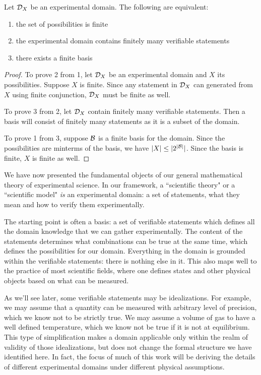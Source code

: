 \documentclass[11pt,letterpaper,fleqn]{memoir} %
\begin{document}
\begin{mathSection}
\begin{prop}
	Let $\mathcal{D}_X$ be an experimental domain. The following are equivalent:
	\begin{enumerate}
		\item the set of possibilities is finite
		\item the experimental domain contains finitely many verifiable statements
		\item there exists a finite basis
	\end{enumerate}
\end{prop}
\begin{proof}
	To prove 2 from 1, let $\mathcal{D}_X$ be an experimental domain and $X$ its possibilities. Suppose $X$ is finite. Since any statement in $\mathcal{D}_X$ can generated from $X$ using finite conjunction, $\mathcal{D}_X$ must be finite as well.
	
	To prove 3 from 2, let $\mathcal{D}_X$ contain finitely many verifiable statements. Then a basis will consist of finitely many statements as it is a subset of the domain.
	
	To prove 1 from 3, suppose $\mathcal{B}$ is a finite basis for the domain. Since the possibilities are minterms of the basis, we have $|X| \leq |2^{|\mathcal{B}|}|$. Since the basis is finite, $X$ is finite as well.
\end{proof}
\end{mathSection}

We have now presented the fundamental objects of our general mathematical theory of experimental science. In our framework, a ``scientific theory" or a ``scientific model" \emph{is} an experimental domain: a set of statements, what they mean and how to verify them experimentally.

The starting point is often a basis: a set of verifiable statements which defines all the domain knowledge that we can gather experimentally. The content of the statements determines what combinations can be true at the same time, which defines the possibilities for our domain. Everything in the domain is grounded within the verifiable statements: there is nothing else in it. This also maps well to the practice of most scientific fields, where one defines states and other physical objects based on what can be measured.

As we'll see later, some verifiable statements may be idealizations. For example, we may assume that a quantity can be measured with arbitrary level of precision, which we know not to be strictly true. We may assume a volume of gas to have a well defined temperature, which we know not be true if it is not at equilibrium. This type of simplification makes a domain applicable only within the realm of validity of those idealizations, but does not change the formal structure we have identified here. In fact, the focus of much of this work will be deriving the details of different experimental domains under different physical assumptions.
\end{document}
